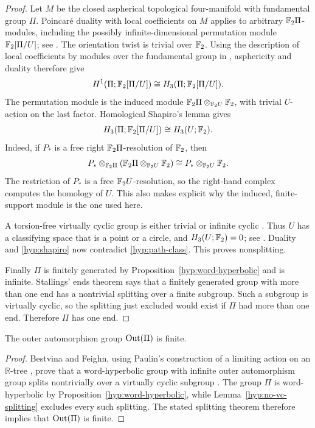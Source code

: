 \begin{proof}
Let \(M\) be the closed aspherical topological four-manifold with
fundamental group \(\Pi\).  Poincar\'e duality with local coefficients
on \(M\) applies to arbitrary \(\mathbb F_2\Pi\)-modules, including the
possibly infinite-dimensional permutation module \(\mathbb F_2[\Pi/U]\);
see \cite[Theorem~10.2]{Spanier1993}.  The orientation twist is trivial
over \(\mathbb F_2\).  Using the description of local coefficients by modules
over the fundamental group in \cite[Section~3.H]{Hatcher2002},
asphericity and duality therefore give
\[
H^1(\Pi;\mathbb F_2[\Pi/U])
 \cong H_3(\Pi;\mathbb F_2[\Pi/U]).
\]
The permutation module is the induced module
\(\mathbb F_2\Pi\otimes_{\mathbb F_2 U}\mathbb F_2\), with trivial \(U\)-action on the
last factor.  Homological Shapiro's lemma
\cite[Lemma~6.3.2]{Weibel1994} gives
\begin{equation}
H_3(\Pi;\mathbb F_2[\Pi/U])\cong H_3(U;\mathbb F_2).
\label{hyp:shapiro}
\end{equation}
Indeed, if \(P_*\) is a free right \(\mathbb F_2\Pi\)-resolution of
\(\mathbb F_2\), then
\[
P_*\otimes_{\mathbb F_2\Pi}
   (\mathbb F_2\Pi\otimes_{\mathbb F_2 U}\mathbb F_2)
 \cong P_*\otimes_{\mathbb F_2 U}\mathbb F_2.
\]
The restriction of \(P_*\) is a free \(\mathbb F_2 U\)-resolution, so the
right-hand complex computes the homology of \(U\).  This also makes
explicit why the induced, finite-support module is the one used here.

A torsion-free virtually cyclic group is either trivial or infinite
cyclic \cite[Sections~4.A.6.2 and~5.B.1]{Stallings1971}.  Thus \(U\) has a
classifying space that is a point or a circle, and
\(H_3(U;\mathbb F_2)=0\); see
\cite[Examples~6.1.3--6.1.4]{Weibel1994}.  Duality and
\eqref{hyp:shapiro} now contradict \eqref{hyp:path-class}.  This proves
nonsplitting.

Finally \(\Pi\) is finitely generated by
Proposition~\ref{hyp:word-hyperbolic} and is infinite.  Stallings'
ends theorem \cite[Section~1.B.6]{Stallings1971} says that a finitely
generated group with more than one end has a nontrivial splitting over
a finite subgroup.  Such a
subgroup is virtually cyclic, so the splitting just excluded would
exist if \(\Pi\) had more than one end.  Therefore \(\Pi\) has one
end.
\end{proof}

\begin{proposition}
\label{hyp:finite-out}
The outer automorphism group \(\operatorname{Out}(\Pi)\) is finite.
\end{proposition}

\begin{proof}
Bestvina and Feighn, using Paulin's construction of a limiting action
on an \(\mathbb R\)-tree \cite{Paulin1991}, prove that a word-hyperbolic
group with infinite outer automorphism group splits nontrivially over a virtually
cyclic subgroup \cite[Corollary~1.3]{BestvinaFeighn1995}.
The group \(\Pi\) is word-hyperbolic by
Proposition~\ref{hyp:word-hyperbolic}, while
Lemma~\ref{hyp:no-vc-splitting} excludes every such splitting.
The stated splitting theorem therefore implies that \(\operatorname{Out}(\Pi)\)
is finite.
\end{proof}
